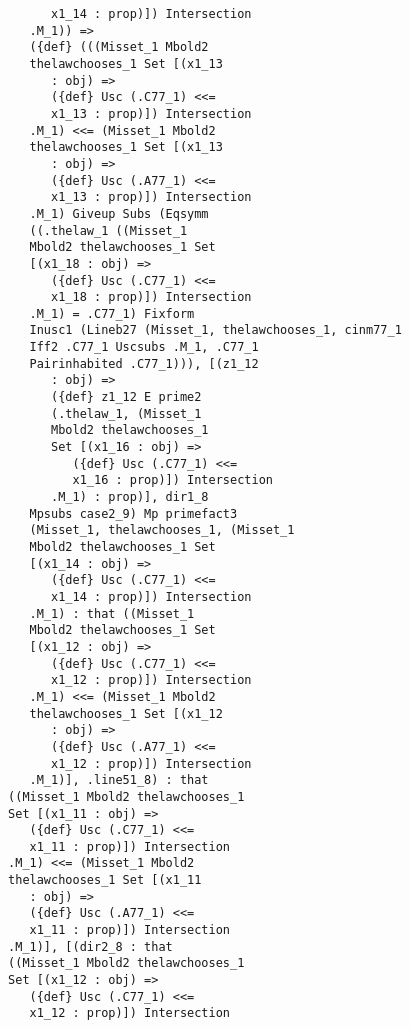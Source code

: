 \documentclass[12pt]{article}
\begin{document}
\begin{verbatim}
                   x1_14 : prop)]) Intersection 
                .M_1)) => 
                ({def} (((Misset_1 Mbold2 
                thelawchooses_1 Set [(x1_13 
                   : obj) => 
                   ({def} Usc (.C77_1) <<= 
                   x1_13 : prop)]) Intersection 
                .M_1) <<= (Misset_1 Mbold2 
                thelawchooses_1 Set [(x1_13 
                   : obj) => 
                   ({def} Usc (.A77_1) <<= 
                   x1_13 : prop)]) Intersection 
                .M_1) Giveup Subs (Eqsymm 
                ((.thelaw_1 ((Misset_1 
                Mbold2 thelawchooses_1 Set 
                [(x1_18 : obj) => 
                   ({def} Usc (.C77_1) <<= 
                   x1_18 : prop)]) Intersection 
                .M_1) = .C77_1) Fixform 
                Inusc1 (Lineb27 (Misset_1, thelawchooses_1, cinm77_1 
                Iff2 .C77_1 Uscsubs .M_1, .C77_1 
                Pairinhabited .C77_1))), [(z1_12 
                   : obj) => 
                   ({def} z1_12 E prime2 
                   (.thelaw_1, (Misset_1 
                   Mbold2 thelawchooses_1 
                   Set [(x1_16 : obj) => 
                      ({def} Usc (.C77_1) <<= 
                      x1_16 : prop)]) Intersection 
                   .M_1) : prop)], dir1_8 
                Mpsubs case2_9) Mp primefact3 
                (Misset_1, thelawchooses_1, (Misset_1 
                Mbold2 thelawchooses_1 Set 
                [(x1_14 : obj) => 
                   ({def} Usc (.C77_1) <<= 
                   x1_14 : prop)]) Intersection 
                .M_1) : that ((Misset_1 
                Mbold2 thelawchooses_1 Set 
                [(x1_12 : obj) => 
                   ({def} Usc (.C77_1) <<= 
                   x1_12 : prop)]) Intersection 
                .M_1) <<= (Misset_1 Mbold2 
                thelawchooses_1 Set [(x1_12 
                   : obj) => 
                   ({def} Usc (.A77_1) <<= 
                   x1_12 : prop)]) Intersection 
                .M_1)], .line51_8) : that 
             ((Misset_1 Mbold2 thelawchooses_1 
             Set [(x1_11 : obj) => 
                ({def} Usc (.C77_1) <<= 
                x1_11 : prop)]) Intersection 
             .M_1) <<= (Misset_1 Mbold2 
             thelawchooses_1 Set [(x1_11 
                : obj) => 
                ({def} Usc (.A77_1) <<= 
                x1_11 : prop)]) Intersection 
             .M_1)], [(dir2_8 : that 
             ((Misset_1 Mbold2 thelawchooses_1 
             Set [(x1_12 : obj) => 
                ({def} Usc (.C77_1) <<= 
                x1_12 : prop)]) Intersection 

\end{verbatim}
\end{document}
